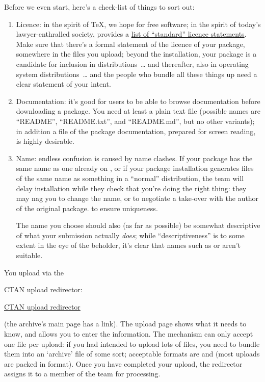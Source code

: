Before we even start, here's a check-list of things to sort out:
\begin{enumerate}
\item Licence: in the spirit of \TeX{}, we hope for free software; in
  the spirit of today's lawyer-enthralled society, 
  provides a %
  \href{http://mirror.ctan.org/help/Catalogue/licenses.html}{list of ``standard'' licence statements}.
  Make sure that there's a formal statement of the licence of your
  package, somewhere in the files you upload; beyond the 
  installation, your package is a candidate for inclusion in \AllTeX{}
  distributions~\dots{} and thereafter, also in operating system
  distributions~\dots{} and the people who bundle all these things up
  need a clear statement of your intent. 
\item Documentation: it's good for users to be able to browse
  documentation before downloading a package.  You need at least a
  plain text  file (possible names are
  ``README'', ``README.txt'', and ``README.md'', but no other variants);
  in addition a
   file of the package documentation, prepared for screen
  reading, is highly desirable.
\item Name: endless confusion is caused by name clashes.  If your
  package has the same name as one already on , or if your
  package installation generates files of the same name as something
  in a ``normal'' distribution, the  team will delay
  installation while they check that you're doing the right thing:
  they may nag you to change the name, or to negotiate a take-over
  with the author of the original package. %
   to ensure uniqueness.
  
  The name you choose should also (as far as possible) be somewhat
  descriptive of what your submission actually \emph{does}; while
  ``descriptiveness'' is to some extent in the eye of the beholder,
  it's clear that names such as  or 
  aren't suitable.
\end{enumerate}
You upload via the
\begin{flatversion}
  CTAN upload redirector: 
\end{flatversion}
\begin{hyperversion}
  \href{http://www.ctan.org/upload}{CTAN upload redirector}
\end{hyperversion}
(the archive's main page has a link).  The upload page shows what it
needs to know, and allows you to enter the information.  The mechanism
can only accept one file per upload: if you had intended to upload
lots of files, you need to bundle them into an `archive' file of some
sort; acceptable formats are  and 
(most uploads are packed in  format).  Once you have
completed your upload, the redirector assigns it to a member of the
team for processing.

